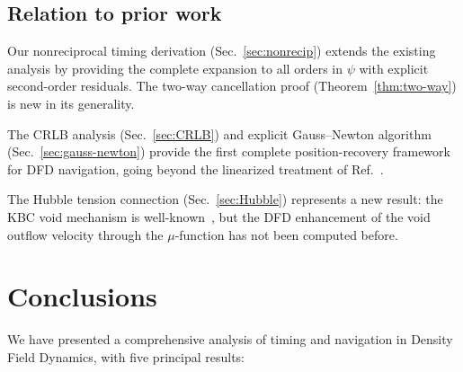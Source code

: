 \documentclass[aps,prd,twocolumn,superscriptaddress,nofootinbib,longbibliography]{revtex4-2}
\begin{document}
\subsection{Relation to prior work}

Our nonreciprocal timing derivation (Sec.~\ref{sec:nonrecip}) extends
the existing analysis by providing the complete expansion to all orders
in $\psi$ with explicit second-order residuals. The two-way cancellation
proof (Theorem~\ref{thm:two-way}) is new in its generality.

The CRLB analysis (Sec.~\ref{sec:CRLB}) and explicit Gauss--Newton
algorithm (Sec.~\ref{sec:gauss-newton}) provide the first complete
position-recovery framework for DFD navigation, going beyond the
linearized treatment of Ref.~\cite{DFD-nav-timing}.

The Hubble tension connection (Sec.~\ref{sec:Hubble}) represents a new
result: the KBC void mechanism is well-known~\cite{Keenan2013}, but
the DFD enhancement of the void outflow velocity through the
$\mu$-function has not been computed before.

\section{Conclusions}\label{sec:conclusions}

We have presented a comprehensive analysis of timing and navigation
in Density Field Dynamics, with five principal results:
\end{document}
